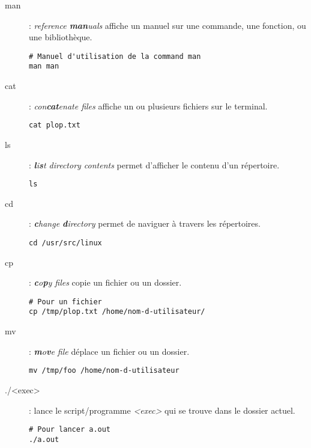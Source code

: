 \begin{description}
\item[man]: \emph{reference \textbf{man}uals} affiche un manuel sur une
	commande, une fonction, ou une bibliothèque.

  \begin{lstlisting}
# Manuel d'utilisation de la command man
man man
  \end{lstlisting}

\item[cat]: \emph{con\textbf{cat}enate files} affiche un ou plusieurs fichiers
	sur le terminal.

  \begin{lstlisting}
cat plop.txt
  \end{lstlisting}

\item[ls]: \emph{\textbf{l}i\textbf{s}t directory contents} permet d'afficher
	le contenu d'un répertoire.

  \begin{lstlisting}
ls
  \end{lstlisting}

\item[cd]: \emph{\textbf{c}hange \textbf{d}irectory} permet de naviguer à
	travers les répertoires.

  \begin{lstlisting}
cd /usr/src/linux
  \end{lstlisting}

\item[cp]: \emph{\textbf{c}o\textbf{p}y files} copie un fichier ou un dossier.

  \begin{lstlisting}
# Pour un fichier
cp /tmp/plop.txt /home/nom-d-utilisateur/
  \end{lstlisting}

\item[mv]: \emph{\textbf{m}o\textbf{v}e file} déplace un fichier ou un dossier.

  \begin{lstlisting}
mv /tmp/foo /home/nom-d-utilisateur
  \end{lstlisting}

\item[./<exec>]: lance le script/programme \emph{<exec>} qui se trouve dans le
	dossier actuel.

  \begin{lstlisting}
# Pour lancer a.out
./a.out
  \end{lstlisting}

\end{description}

